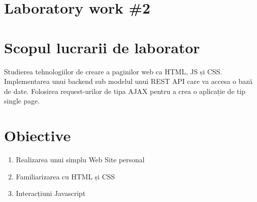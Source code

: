 \section*{Laboratory work \#2}

\section{Scopul lucrarii de laborator}
Studierea tehnologiilor de creare a paginilor web ca HTML, JS și CSS. Implementarea unui backend sub modelul unui REST API care va accesa o bază de date. Folosirea request-urilor de tipa AJAX pentru a crea o aplicație de tip single page.
\section{Obiective}

\begin{enumerate}
\item Realizarea unui simplu Web Site personal
\item Familiarizarea cu HTML și CSS
\item Interacțiuni Javascript
\end{enumerate}

\clearpage